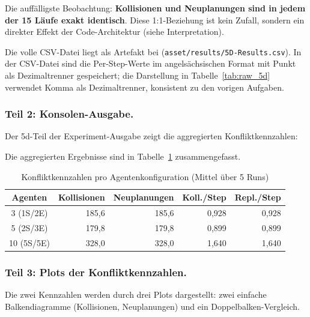 Die auffälligste Beobachtung: \textbf{Kollisionen und Neuplanungen sind in jedem der 15 Läufe exakt identisch}. Diese 1:1-Beziehung ist kein Zufall, sondern ein direkter Effekt der Code-Architektur (siehe Interpretation).

Die volle CSV-Datei liegt als Artefakt bei (\texttt{asset/results/5D-Results.csv}). In der CSV-Datei sind die Per-Step-Werte im angelsächsischen Format mit Punkt als Dezimaltrenner gespeichert; die Darstellung in Tabelle~\ref{tab:raw_5d} verwendet Komma als Dezimaltrenner, konsistent zu den vorigen Aufgaben.

\subsubsection{Teil 2: Konsolen-Ausgabe.}
Der 5d-Teil der Experiment-Ausgabe zeigt die aggregierten Konfliktkennzahlen:



Die aggregierten Ergebnisse sind in Tabelle~\ref{tab:konflikte_5d} zusammengefasst.

\begin{table}[H]
    \centering
    \begin{tabular}{c r r r r}
        \toprule
        \textbf{Agenten} & \textbf{Kollisionen} & \textbf{Neuplanungen} & \textbf{Koll./Step} & \textbf{Repl./Step} \\
        \midrule
        3 (1S/2E)   & 185{,}6 & 185{,}6 & 0{,}928 & 0{,}928 \\
        5 (2S/3E)   & 179{,}8 & 179{,}8 & 0{,}899 & 0{,}899 \\
        10 (5S/5E)  & 328{,}0 & 328{,}0 & 1{,}640 & 1{,}640 \\
        \bottomrule
    \end{tabular}
    \caption{Konfliktkennzahlen pro Agentenkonfiguration (Mittel über 5 Runs)}
    \label{tab:konflikte_5d}
\end{table}

\subsubsection{Teil 3: Plots der Konfliktkennzahlen.}
Die zwei Kennzahlen werden durch drei Plots dargestellt: zwei einfache Balkendiagramme (Kollisionen, Neuplanungen) und ein Doppelbalken-Vergleich.

